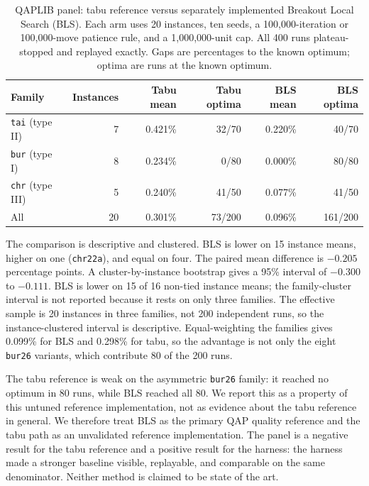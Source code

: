 \documentclass[10pt]{article}
\begin{document}
\begin{table}[H]
\centering
\caption{QAPLIB panel: tabu reference versus separately implemented Breakout Local Search (BLS). Each
arm uses 20 instances, ten seeds, a 100,000-iteration or 100,000-move patience rule, and a
1,000,000-unit cap. All 400 runs plateau-stopped and replayed exactly. Gaps are percentages to the
known optimum; optima are runs at the known optimum.}
\label{tab:qap}
\small
\begin{tabular}{lrrrrr}
\toprule
Family & Instances & Tabu mean & Tabu optima & BLS mean & BLS optima \\
\midrule
\texttt{tai} (type II) & 7 & 0.421\% & 32/70 & 0.220\% & 40/70 \\
\texttt{bur} (type I)   & 8 & 0.234\% & 0/80  & 0.000\% & 80/80 \\
\texttt{chr} (type III) & 5 & 0.240\% & 41/50 & 0.077\% & 41/50 \\
\midrule
All                     & 20 & 0.301\% & 73/200 & 0.096\% & 161/200 \\
\bottomrule
\end{tabular}
\end{table}

The comparison is descriptive and clustered. BLS is lower on 15 instance means, higher on one
(\texttt{chr22a}), and equal on four. The paired mean difference is $-0.205$ percentage points. A
cluster-by-instance bootstrap gives a 95\% interval of $-0.300$ to $-0.111$. BLS is lower on 15 of
16 non-tied instance means; the family-cluster interval is not reported because it rests on only three
families. The effective sample is 20 instances in three families, not 200 independent runs, so the
instance-clustered interval is descriptive. Equal-weighting the families gives 0.099\% for BLS and 0.298\% for
tabu, so the advantage is not only the eight \texttt{bur26} variants, which contribute 80 of the 200
runs.

The tabu reference is weak on the asymmetric \texttt{bur26} family: it reached no optimum in 80 runs,
while BLS reached all 80. We report this as a property of this untuned reference implementation, not
as evidence about the tabu reference in general. We therefore treat BLS as the primary QAP quality reference
and the tabu path as an unvalidated reference implementation. The panel is a negative result for the
tabu reference and a positive result for the harness: the harness made a stronger baseline visible, replayable, and
comparable on the same denominator. Neither method is claimed to be state of the art.
\end{document}
